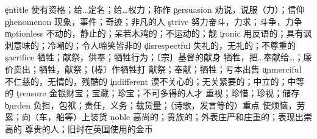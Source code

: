 \begin{multicols}{2}
\c{entitle}  \vt 使有资格；给…定名；给…权力；称作
\c{persuasion}  \n 劝说，说服（力）；信仰
\c{phenomenon}  \n 现象，事件；奇迹；非凡的人
\c{strive}  \vi 努力奋斗，力求；斗争，力争
\c{motionless}  \a 不动的，静止的；呆若木鸡的；不运动的；靓
\c{ironic}  \a 用反语的；具有讽刺意味的；冷嘲的；令人啼笑皆非的
\c{disrespectful}  \a 失礼的，无礼的；不尊重的
\c{sacrifice}  \n 牺牲；献祭，供奉；牺牲行为；〔宗〕基督的献身 \v 牺牲，把…奉献给…；廉价卖出；牺牲，献祭；〔棒〕作牺牲打 \vt 献祭；奉献；牺牲；亏本出售
\c{unmerciful}  \a 不仁慈的，无情的，残酷的
\c{indifferent}  \a 漠不关心的；无关紧要的；中立的；中等的
\c{treasure}  \n 金银财宝；宝藏；珍宝；不可多得的人才 \vt 重视；珍惜；珍视；储存
\c{burden}  \n 负担，包袱；责任，义务；载货量；（诗歌，发言等的）重点 \vt 使烦恼，劳累；向（车，船等）上装货
\c{noble}  \a 高尚的；贵族的；外表庄严和庄重的；表现出崇高的 \n 尊贵的人；旧时在英国使用的金币
\end{multicols}
